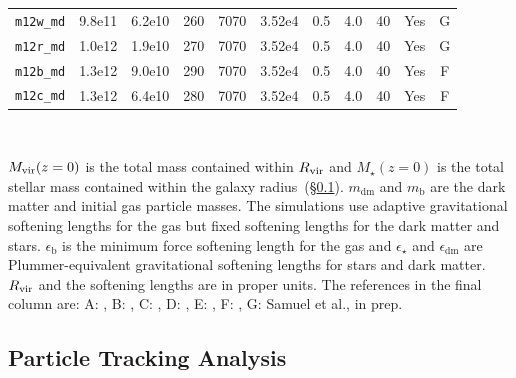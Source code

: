 \documentclass[fleqn,usenatbib]{mnras}
\begin{document}
\begin{table}
\begin{tabular}{ccccccccccc}
\texttt{m12w\_md}    & 9.8e11                 & 6.2e10                  &  260                        &  7070           &  3.52e4         & 0.5         & 4.0           &      40       &                Yes                     &    G              \\ 
\texttt{m12r\_md}    & 1.0e12                  & 1.9e10                 &  270                        &  7070           &  3.52e4         & 0.5         & 4.0           &      40       &                Yes                     &    G             \\
\texttt{m12b\_md}    & 1.3e12                  & 9.0e10                  &  290                        &  7070           &  3.52e4         & 0.5         & 4.0           &      40       &                Yes                     &    F             \\ 
\texttt{m12c\_md}    & 1.3e12                  & 6.4e10                  &  280                        &  7070           &  3.52e4         & 0.5         & 4.0           &      40       &                Yes                     &   F                \\ 
\hline
\end{tabular}
\\
\begin{flushleft}
$M_{\rm vir}(z=0)$ is the total mass contained within $R_{\rm vir}$ and $M_\star(z=0)$ is the total stellar mass contained within the galaxy radius~(\S\ref{sec:analysis}). 
$m_{\textrm{dm}}$ and $m_\textrm{b}$ are the dark matter and initial gas particle masses.
The simulations use adaptive gravitational softening lengths for the gas but fixed softening lengths for the dark matter and stars. 
$\epsilon_\textrm{b}$ is the minimum force softening length for the gas and $\epsilon_{\star}$ and $\epsilon_{\textrm{dm}}$ are Plummer-equivalent gravitational softening lengths for stars and dark matter.
 $R_{\rm vir}$ and the softening lengths are in proper units.
The references in the final column are:
A: \cite{Hopkins2017},
B: \cite{Chan2018},
C: \cite{Wetzel2016},
D: \cite{Garrison-Kimmel2017a},
E: \cite{El-Badry2017},
F: \cite{Garrison-Kimmel2018},
G: Samuel et al., in prep.
\end{flushleft}
\label{table:simulations_used}
\end{table}

\subsection{Particle Tracking Analysis}
\label{sec:analysis}
\end{document}

